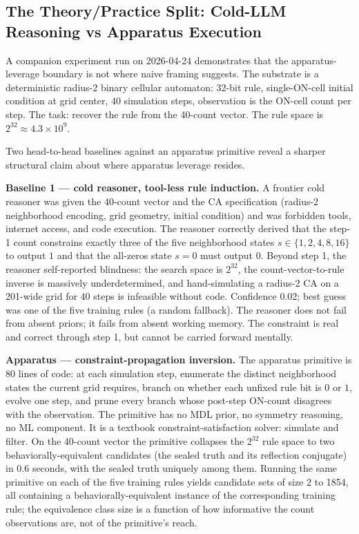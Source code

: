 \documentclass[11pt]{article}
\begin{document}
\subsection*{The Theory/Practice Split: Cold-LLM Reasoning vs Apparatus Execution}

A companion experiment run on 2026-04-24 demonstrates that the apparatus-leverage boundary is not where naive framing suggests. The substrate is a deterministic radius-2 binary cellular automaton: 32-bit rule, single-ON-cell initial condition at grid center, 40 simulation steps, observation is the ON-cell count per step. The task: recover the rule from the 40-count vector. The rule space is $2^{32} \approx 4.3 \times 10^9$.

Two head-to-head baselines against an apparatus primitive reveal a sharper structural claim about where apparatus leverage resides.

\textbf{Baseline 1 --- cold reasoner, tool-less rule induction.} A frontier cold reasoner was given the 40-count vector and the CA specification (radius-2 neighborhood encoding, grid geometry, initial condition) and was forbidden tools, internet access, and code execution. The reasoner correctly derived that the step-1 count constrains exactly three of the five neighborhood states $s \in \{1, 2, 4, 8, 16\}$ to output $1$ and that the all-zeros state $s = 0$ must output $0$. Beyond step 1, the reasoner self-reported blindness: the search space is $2^{32}$, the count-vector-to-rule inverse is massively underdetermined, and hand-simulating a radius-2 CA on a 201-wide grid for 40 steps is infeasible without code. Confidence $0.02$; best guess was one of the five training rules (a random fallback). The reasoner does not fail from absent priors; it fails from absent working memory. The constraint is real and correct through step 1, but cannot be carried forward mentally.

\textbf{Apparatus --- constraint-propagation inversion.} The apparatus primitive is 80 lines of code: at each simulation step, enumerate the distinct neighborhood states the current grid requires, branch on whether each unfixed rule bit is $0$ or $1$, evolve one step, and prune every branch whose post-step ON-count disagrees with the observation. The primitive has no MDL prior, no symmetry reasoning, no ML component. It is a textbook constraint-satisfaction solver: simulate and filter. On the 40-count vector the primitive collapses the $2^{32}$ rule space to two behaviorally-equivalent candidates (the sealed truth and its reflection conjugate) in 0.6 seconds, with the sealed truth uniquely among them. Running the same primitive on each of the five training rules yields candidate sets of size 2 to 1854, all containing a behaviorally-equivalent instance of the corresponding training rule; the equivalence class size is a function of how informative the count observations are, not of the primitive's reach.
\end{document}

